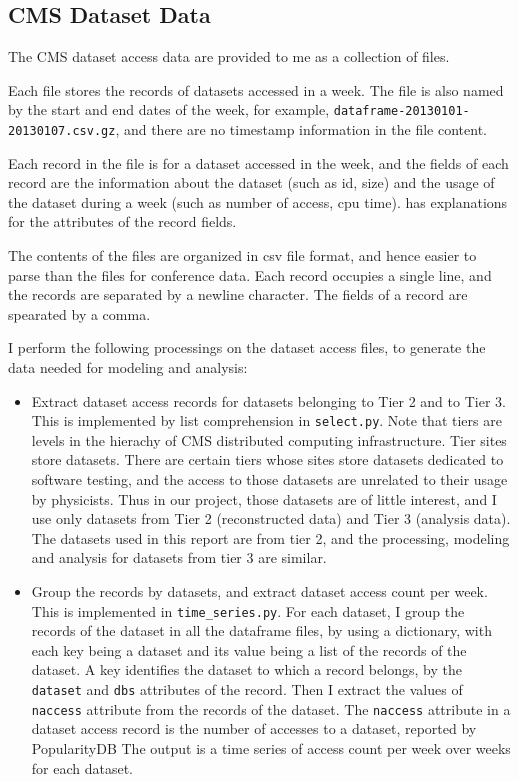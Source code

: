 \documentclass[final, 12pt]{elsarticle}
\begin{document}
\subsection{CMS Dataset Data}

The CMS dataset access data are provided to me as a collection of files.

Each file stores the records of datasets accessed in a week. The file is also named by the start and end dates of the week, for example, \verb|dataframe-20130101-20130107.csv.gz|, and there are no timestamp information in the file content.

Each record in the file is for a dataset accessed in the week, and the fields of each record are the information about the dataset (such as id, size) and the usage of the dataset during a week (such as number of access, cpu time). \cite{web:vk} has explanations for the attributes of the record fields.

The contents of the files are organized in csv file format, and hence easier to parse  than the files for conference data.
Each record occupies a single line, and the records are separated by a newline character.
The fields of a record are spearated by a comma.


I perform the following processings on the dataset access files, to generate the data needed for modeling and analysis:

\begin{itemize}
  
\item Extract dataset access records for datasets belonging to Tier 2 and to Tier 3. This is implemented by list comprehension in \verb|select.py|.
Note that
tiers are levels in the hierachy of CMS distributed computing infrastructure. Tier sites store datasets.
There are certain tiers whose sites store datasets dedicated to software testing, and the access to those datasets are unrelated to their usage by physicists. Thus in our project, those  datasets are of little interest, and 
I use only datasets from Tier 2 (reconstructed data) and Tier 3 (analysis data). The datasets used in this report are from tier 2, and the processing, modeling and analysis for datasets from tier 3 are similar.

\item Group the records by datasets, and extract dataset access count per week.
This is implemented in \verb|time_series.py|.
For each dataset, I group the records of the dataset in all the dataframe files, by using a dictionary, with each key being a dataset and its value being a list of the records of the dataset. A key identifies the dataset to which a record belongs, by the \verb|dataset| and \verb|dbs| attributes of the record.
Then I extract the values of \verb|naccess| attribute from the records of the dataset.
The \verb|naccess| attribute in a dataset access record is the number of accesses to a dataset, reported by PopularityDB
The output is  a time series of access count per week over weeks for each dataset.

\end{itemize}
\end{document}

